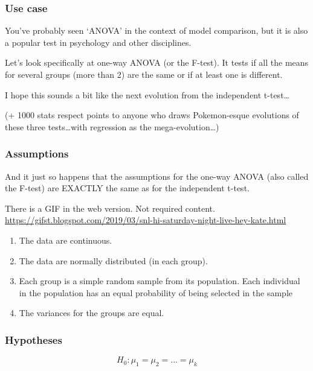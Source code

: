 \documentclass[
  openany]{book}
\providecommand{\tightlist}{%
  \setlength{\itemsep}{0pt}\setlength{\parskip}{0pt}}
\begin{document}
\hypertarget{use-case-2}{%
\subsubsection{Use case}\label{use-case-2}}

You've probably seen `ANOVA' in the context of model comparison, but it is also a popular test in psychology and other disciplines.

Let's look specifically at one-way ANOVA (or the F-test). It tests if all the means for several groups (more than 2) are the same or if at least one is different.

I hope this sounds a bit like the next evolution from the independent t-test\ldots{}

(+ 1000 stats respect points to anyone who draws Pokemon-esque evolutions of these three tests\ldots with regression as the mega-evolution\ldots)

\hypertarget{assumptions-2}{%
\subsubsection{Assumptions}\label{assumptions-2}}

And it just so happens that the assumptions for the one-way ANOVA (also called the F-test) are EXACTLY the same as for the independent t-test.

There is a GIF in the web version. Not required content. \url{https://gifst.blogspot.com/2019/03/snl-hi-saturday-night-live-hey-kate.html}

\begin{enumerate}
\def\labelenumi{\arabic{enumi}.}
\tightlist
\item
  The data are continuous.
\item
  The data are normally distributed (in each group).
\item
  Each group is a simple random sample from its population. Each individual in the population has an equal probability of being selected in the sample
\item
  The variances for the groups are equal.
\end{enumerate}

\hypertarget{hypotheses-2}{%
\subsubsection{Hypotheses}\label{hypotheses-2}}

\[H_0: \mu_1 = \mu_2 = ... = \mu_k \]
\end{document}

